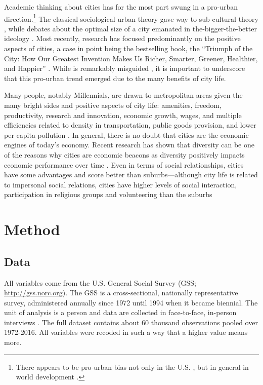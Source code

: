 \documentclass[11pt, letterpaper]{article}
\begin{document}
\begin{spacing}{1.4}
Academic thinking about cities has for the most part swung in a pro-urban direction.\footnote{There appears to be pro-urban bias not only in the U.S. \cite{hansonCityJournalautumn15}, but in general in world development \citep{lipton77}.} The classical sociological urban theory \citep{wirth38,milgram70,park15,park84,simmel03,tonnies57} gave way to
  sub-cultural theory \citep{fischer75,fischer95,wilson85, palisi83}, while debates about the optimal size of a city \citep{richardson72,singell74,alonso60,alonso71,elgin75,capello00} emanated in the-bigger-the-better ideology \citep{glaeser11}. Most recently, research has focused predominantly on the positive aspects of cities, a case in point being the bestselling book, the ``Triumph of the City: How Our Greatest Invention Makes Us Richer, Smarter, Greener, Healthier, and Happier'' \citep{glaeser11}. While \citet{glaeser11} is remarkably misguided  \citep{aokCityBook15,peck16}, it is important to underscore that this pro-urban trend emerged due to the many benefits of city life. 
   
Many people, notably  Millennials, are drawn to metropolitan areas \citep{aok-swbGenYcity18} given the many bright sides and positive aspects of city life: amenities, freedom, productivity, research and innovation, economic growth, wages, and multiple efficiencies related to
density in transportation, public goods provision, and lower per capita pollution \citep{tonnies57,osullivan09,meyer13,rosenthal02,bettencourt10}.
In general, there is no doubt that cities are the economic engines of today's
economy. Recent research has shown that diversity can be one of the reasons why
cities are economic beacons as diversity positively impacts economic performance
over time \citep[e.g.,][]{rodriguez2019does}. Even in terms of social
relationships, cities have some advantages and score better than
suburbs---although city life is related to impersonal social relations, cities have higher levels of social interaction, participation in religious groups and volunteering than the suburbs \citep{nguyen10,mazumdar18}
%


\section*{Method} 

\subsection*{Data}

All variables come from the U.S. General Social Survey (GSS;
\url{http://gss.norc.org}). The GSS is a cross-sectional, nationally
representative survey, administered annually since 1972 until 1994 when it
became biennial. The unit of analysis is a person and data are collected in face-to-face, in-person interviews \citep{davis07}. The full dataset contains about 60 thousand observations pooled over 1972-2016. All variables were recoded in such a way that a higher value means more. 


\end{spacing}
\end{document}
